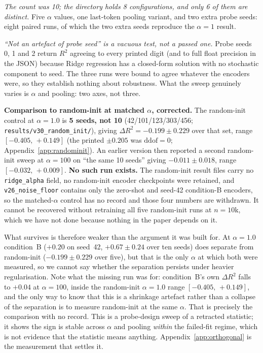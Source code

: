 \emph{The count was 10; the directory holds 8 configurations, and only 6 of them
are distinct.}  Five $\alpha$ values, one last-token pooling variant, and two
extra probe seeds: eight paired runs, of which the two extra seeds reproduce the
$\alpha{=}1$ result.

\emph{``Not an artefact of probe seed'' is a vacuous test, not a passed one.}
Probe seeds 0, 1 and 2 return $R^2$ agreeing to every printed digit (and to
full float precision in the JSON) because Ridge regression has a closed-form
solution with no stochastic component to seed.  The three runs were bound to
agree whatever the encoders were, so they establish nothing about robustness.
What the sweep genuinely varies is $\alpha$ and pooling: two axes, not three.

\textbf{Comparison to random-init at matched $\alpha$, corrected.}
The random-init control at $\alpha{=}1.0$ is \textbf{5 seeds, not 10}
(42/101/123/303/456; \texttt{results/v30\_random\_init/}), giving
$\Delta R^2{=}{-}0.199{\pm}0.229$ over that set, range $[-0.405,\,+0.149]$
(the printed $\pm0.205$ was $\text{ddof}{=}0$; Appendix~\ref{app:randominit}).
An earlier version then reported a second random-init sweep at $\alpha{=}100$ on
``the same 10 seeds'' giving $-0.011{\pm}0.018$, range $[-0.032,\,+0.009]$.
\textbf{No such run exists.}  The random-init result files carry no
\texttt{ridge\_alpha} field, no random-init encoder checkpoints were retained, and
\texttt{v26\_noise\_floor} contains only the zero-shot and seed-42
condition-B encoders, so the matched-$\alpha$ control has no record and those
four numbers are withdrawn.  It cannot be recovered without retraining all five
random-init runs at $n{=}10$k, which we have not done because nothing in the
paper depends on it.

What survives is therefore weaker than the argument it was built for.  At
$\alpha{=}1.0$ condition~B ($+0.20$ on seed~42, $+0.67{\pm}0.24$ over ten seeds)
does separate from random-init ($-0.199{\pm}0.229$ over five), but that is the
only $\alpha$ at which both were measured, so we cannot say whether the
separation persists under heavier regularisation.  Note what the missing run was
for: condition~B's own $\Delta R^2$ falls to $+0.04$ at $\alpha{=}100$, inside
the random-init \emph{$\alpha{=}1.0$} range $[-0.405,\,+0.149]$, and the only way
to know that this is a shrinkage artefact rather than a collapse of the
separation is to measure random-init at the same $\alpha$.  That is precisely the
comparison with no record.  This is a
probe-design sweep of a retracted statistic; it shows the sign is stable across
$\alpha$ and pooling \emph{within} the failed-fit regime, which is not evidence
that the statistic means anything.  Appendix~\ref{app:orthogonal} is the
measurement that settles it.

